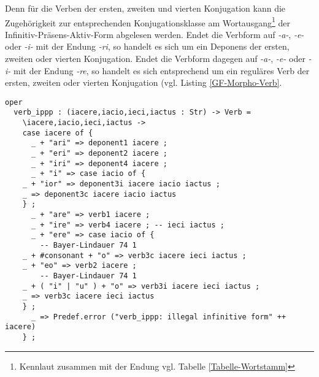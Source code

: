Denn für die Verben der ersten, zweiten und vierten Konjugation kann die Zugehörigkeit zur entsprechenden Konjugationsklasse am Wortausgang\footnote{Kennlaut zusammen mit der Endung vgl. Tabelle \ref{Tabelle-Wortstamm}} der Infinitiv-Präsens-Aktiv-Form abgelesen werden. Endet die Verbform auf \textit{-a-}, \textit{-e-} oder \textit{-i-} mit der Endung \textit{-ri}, so handelt es sich um ein Deponens der ersten, zweiten oder vierten Konjugation. Endet die Verbform dagegen auf \textit{-a-}, \textit{-e-} oder \textit{-i-} mit der Endung \textit{-re}, so handelt es sich entsprechend um ein reguläres Verb der ersten, zweiten oder vierten Konjugation (vgl. Listing \ref{GF-Morpho-Verb}. \par
\begin{lstlisting}[float=h!tp,caption={Smart Paradigm für vier Verbformen (vgl. \textbf{MorphoLat.gf})},label={GF-Morpho-Verb-Ippp},basicstyle=\small]
oper
  verb_ippp : (iacere,iacio,ieci,iactus : Str) -> Verb = 
    \iacere,iacio,ieci,iactus ->
    case iacere of {
      _ + "ari" => deponent1 iacere ;
      _ + "eri" => deponent2 iacere ;
      _ + "iri" => deponent4 iacere ;
      _ + "i" => case iacio of {
  	_ + "ior" => deponent3i iacere iacio iactus ;
  	_ => deponent3c iacere iacio iactus
  	} ;
      _ + "are" => verb1 iacere ;
      _ + "ire" => verb4 iacere ; -- ieci iactus ;
      _ + "ere" => case iacio of {
        -- Bayer-Lindauer 74 1
  	_ + #consonant + "o" => verb3c iacere ieci iactus ; 
  	_ + "eo" => verb2 iacere ;
        -- Bayer-Lindauer 74 1
  	_ + ( "i" | "u" ) + "o" => verb3i iacere ieci iactus ; 
  	_ => verb3c iacere ieci iactus
  	} ;
      _ => Predef.error ("verb_ippp: illegal infinitive form" ++ iacere) 
    } ;
\end{lstlisting}
